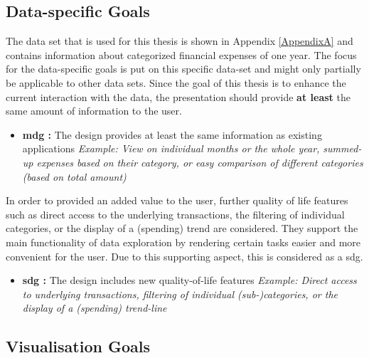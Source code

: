 
\subsection{Data-specific Goals}

The data set that is used for this thesis is shown in Appendix \ref{AppendixA} and contains information about categorized financial expenses of one year. The focus for the data-specific goals is put on this specific data-set and might only partially be applicable to other data sets. Since the goal of this thesis is to enhance the current interaction with the data, the presentation should provide \textbf{at least} the same amount of information to the user.
\begin{itemize}[noitemsep,nolistsep]
	\item \textbf{\gls{mdg} :} The design provides at least the same information as  existing applications \newline
		\textit{Example: View on individual months or the whole year, summed-up expenses based on their category, or easy comparison of different categories (based on total amount)}
\end{itemize}
In order to provided an added value to the user, further quality of life features such as direct access to the underlying transactions, the filtering of individual categories, or the display of a (spending) trend are considered. They support the main functionality of data exploration by rendering certain tasks easier and more convenient for the user. Due to this supporting aspect, this is considered as a \gls{sdg}.
\begin{itemize}[noitemsep,nolistsep]
	\item \textbf{\gls{sdg} :} The design includes new quality-of-life features \newline
	\textit{Example: Direct access to underlying transactions, filtering of individual (sub-)categories, or the display of a (spending) trend-line}
\end{itemize}





\subsection{Visualisation Goals}

